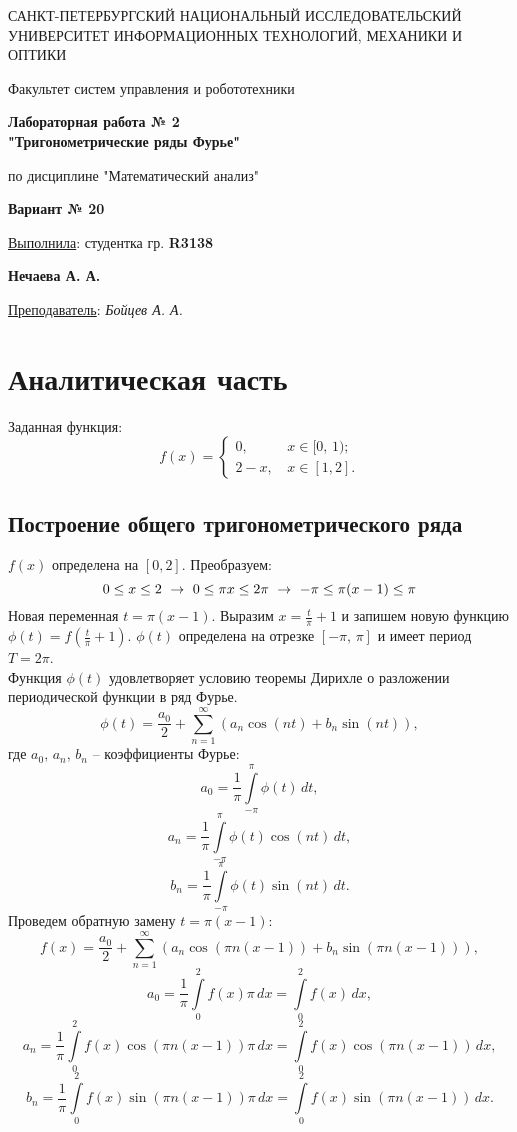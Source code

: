\documentclass[a5paper, 10pt]{article}
\theoremstyle{definition}
\theoremstyle{plain}
\theoremstyle{remark}
\newcommand*{\titlePage}{
	\thispagestyle{title}
	\begingroup
	\begin{center}
		\vspace*{6ex}
		
		{\small
			САНКТ-ПЕТЕРБУРГСКИЙ НАЦИОНАЛЬНЫЙ ИССЛЕДОВАТЕЛЬСКИЙ УНИВЕРСИТЕТ ИНФОРМАЦИОННЫХ ТЕХНОЛОГИЙ, МЕХАНИКИ И ОПТИКИ	
		}
		
		\vspace*{2ex}
		
		{\normalsize
			Факультет систем управления и робототехники
		}
		
		\vspace*{15ex}
		
		{\Large \bfseries 
			Лабораторная работа № 2\\
"Тригонометрические ряды Фурье"
		}
\vspace*{2ex}
		
		{\normalsize
			по дисциплине "Математический анализ"
		}

                    \vspace*{2ex}

                    { \bfseries 
			Вариант № 20
		}
	\end{center}
	\vspace*{20ex}
	\begin{flushright}
		{\large 
			\underline{Выполнила}: студентка гр. \textbf{R3138}\\
			\begin{flushright}
				\textbf{Нечаева А. А.}\\
			\end{flushright}
		}
		
		\vspace*{5ex}
		
		{\large 
			\underline{Преподаватель}: \textit{Бойцев А. А.}
		}
	\end{flushright}	
	\newpage
	\setcounter{page}{2}
	\endgroup}
\begin{document}
	\titlePage
	\pagestyle{style}
\newpage

\section{Аналитическая часть}
Заданная функция:
\begin{equation}
f(x) = 
\begin{cases}
0, \, & x \in [0, \, 1);\\
2 - x, \, & x \in [1, 2].
\end{cases}
\end{equation}


\subsection{Построение общего тригонометрического ряда}	
$f(x)$ определена на $[0, 2]$. Преобразуем:
\begin{equation*}
0 \leq x \leq 2  \, \, \to \, \,
0 \leq \pi x \leq 2 \pi \, \, \to \, \,
-\pi \leq \pi(x-1) \leq \pi\\
\end{equation*}
Новая переменная $t =\pi(x-1)$. Выразим $x = \frac{t}{\pi} + 1$ и запишем новую функцию $\phi (t) = f( \frac{t}{\pi} + 1)$. $\phi (t)$ определена на отрезке $[-\pi, \, \pi]$ и имеет период $T = 2 \pi$.\\
Функция $\phi (t)$ удовлетворяет условию теоремы Дирихле о разложении периодической функции в ряд Фурье.
\begin{equation*}
\phi (t) = \frac{a_0}{2} + \sum \limits_{n = 1}^{\infty} \left( a_n \cos(nt) + b_n \sin(nt) \right), 
\end{equation*}
где $a_0, \, a_n, \, b_n$ -- коэффициенты Фурье:\\
\begin{equation*}
a_0 = \frac{1}{\pi} \int \limits_{-\pi}^{\pi} \phi(t) \, dt,
\end{equation*}
\begin{equation*}
a_n = \frac{1}{\pi} \int \limits_{-\pi}^{\pi} \phi(t) \cos(nt) \, dt,
\end{equation*}
\begin{equation*}
b_n = \frac{1}{\pi} \int \limits_{-\pi}^{\pi} \phi(t) \sin(nt) \, dt.
\end{equation*}
Проведем обратную замену $t =\pi(x-1)$:
\begin{equation*}
f (x) = \frac{a_0}{2} + \sum \limits_{n = 1}^{\infty} \left( a_n \cos(\pi n(x-1)) + b_n \sin(\pi n(x-1)) \right), 
\end{equation*}
\begin{equation*}
a_0 = \frac{1}{\pi} \int \limits_{0}^{2} f(x) \pi \, dx = \int \limits_{0}^{2} f(x) \, dx, 
\end{equation*}
\begin{equation*}
a_n = \frac{1}{\pi} \int \limits_{0}^{2} f(x) \cos(\pi n(x-1))  \pi \, dx = \int \limits_{0}^{2} f(x) \cos(\pi n(x-1)) \, dx ,
\end{equation*}
\begin{equation*}
b_n = \frac{1}{\pi} \int \limits_{0}^{2} f(x) \sin(\pi n(x-1)) \pi \, dx = \int \limits_{0}^{2} f(x) \sin(\pi n(x-1)) \, dx .
\end{equation*}
\end{document}
